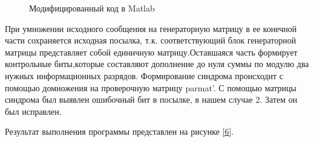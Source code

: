 \documentclass[a4paper,14pt]{extarticle}
\begin{document}
\begin{figure}[H]
\caption{Модифицированный код в Matlab}
\label{5}
\end{figure}

При умножении исходного сообщения на генераторную матрицу в ее конечной части сохраняется исходная посылка, т.к. соответствующий блок генераторной матрицы представляет собой единичную матрицу.Оставшаяся часть формирует контрольные биты,которые составляют дополнение до нуля суммы по модулю два нужных информационных разрядов. Формирование синдрома происходит с помощью домножения на проверочную матрицу parmat'. С помощью матрицы синдрома был выявлен ошибочный бит в посылке, в нашем случае 2. Затем он был исправлен. 

Результат выполнения программы представлен на рисунке \ref{6}.
\end{document}

